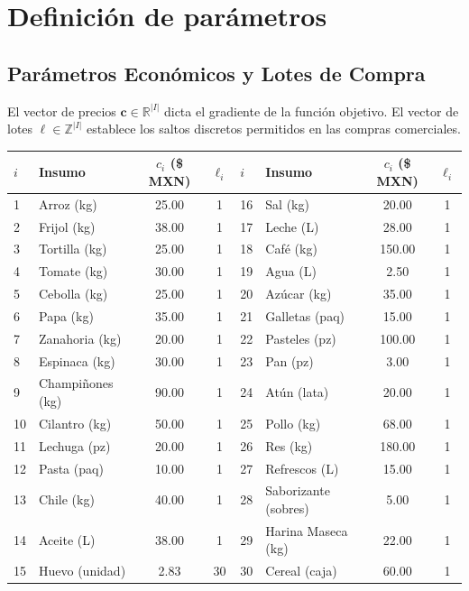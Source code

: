 \documentclass[12pt, a4paper]{article}
\begin{document}
\section{Definición de parámetros}

\subsection{Parámetros Económicos y Lotes de Compra}
El vector de precios $\mathbf{c} \in \mathbb{R}^{|I|}$ dicta el gradiente de la función objetivo. El vector de lotes $\ell \in \mathbb{Z}^{|I|}$ establece los saltos discretos permitidos en las compras comerciales.

\begin{longtable}{llcc|llcc}
\toprule
$i$ & \textbf{Insumo} & $c_i$ (\$ MXN) & $\ell_i$ & $i$ & \textbf{Insumo} & $c_i$ (\$ MXN) & $\ell_i$ \\
\midrule
1  & Arroz (kg) & 25.00 & 1 & 16 & Sal (kg) & 20.00 & 1 \\
2  & Frijol (kg) & 38.00 & 1 & 17 & Leche (L) & 28.00 & 1 \\
3  & Tortilla (kg) & 25.00 & 1 & 18 & Café (kg) & 150.00 & 1 \\
4  & Tomate (kg) & 30.00 & 1 & 19 & Agua (L) & 2.50 & 1 \\
5  & Cebolla (kg) & 25.00 & 1 & 20 & Azúcar (kg) & 35.00 & 1 \\
6  & Papa (kg) & 35.00 & 1 & 21 & Galletas (paq) & 15.00 & 1 \\
7  & Zanahoria (kg)& 20.00 & 1 & 22 & Pasteles (pz) & 100.00 & 1 \\
8  & Espinaca (kg) & 30.00 & 1 & 23 & Pan (pz) & 3.00 & 1 \\
9  & Champiñones (kg)& 90.00 & 1 & 24 & Atún (lata) & 20.00 & 1 \\
10 & Cilantro (kg) & 50.00 & 1 & 25 & Pollo (kg) & 68.00 & 1 \\
11 & Lechuga (pz) & 20.00 & 1 & 26 & Res (kg) & 180.00 & 1 \\
12 & Pasta (paq) & 10.00 & 1 & 27 & Refrescos (L) & 15.00 & 1 \\
13 & Chile (kg) & 40.00 & 1 & 28 & Saborizante (sobres)& 5.00 & 1 \\
14 & Aceite (L) & 38.00 & 1 & 29 & Harina Maseca (kg) & 22.00 & 1 \\
15 & Huevo (unidad)& 2.83 & 30 & 30 & Cereal (caja) & 60.00 & 1 \\
\bottomrule
\end{longtable}
\end{document}
